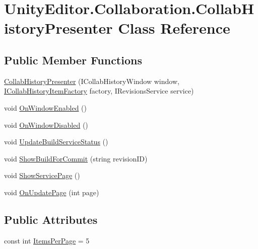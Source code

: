 \hypertarget{class_unity_editor_1_1_collaboration_1_1_collab_history_presenter}{}\section{Unity\+Editor.\+Collaboration.\+Collab\+History\+Presenter Class Reference}
\label{class_unity_editor_1_1_collaboration_1_1_collab_history_presenter}
\subsection*{Public Member Functions}
\begin{DoxyCompactItemize}
\item 
\mbox{\hyperlink{class_unity_editor_1_1_collaboration_1_1_collab_history_presenter_a98a53853b14ff55206d6d1a0c97529f1}{Collab\+History\+Presenter}} (I\+Collab\+History\+Window window, \mbox{\hyperlink{interface_unity_editor_1_1_collaboration_1_1_i_collab_history_item_factory}{I\+Collab\+History\+Item\+Factory}} factory, I\+Revisions\+Service service)
\item 
void \mbox{\hyperlink{class_unity_editor_1_1_collaboration_1_1_collab_history_presenter_acba3dc89a6ab81f606e1aab7f5f67630}{On\+Window\+Enabled}} ()
\item 
void \mbox{\hyperlink{class_unity_editor_1_1_collaboration_1_1_collab_history_presenter_a1d9943c824329af4ff6008dc891b6cba}{On\+Window\+Disabled}} ()
\item 
void \mbox{\hyperlink{class_unity_editor_1_1_collaboration_1_1_collab_history_presenter_affaaa9e1fa64b6028db288c380c0023d}{Update\+Build\+Service\+Status}} ()
\item 
void \mbox{\hyperlink{class_unity_editor_1_1_collaboration_1_1_collab_history_presenter_af05c6fa5503d623f18938306e1c764f1}{Show\+Build\+For\+Commit}} (string revision\+ID)
\item 
void \mbox{\hyperlink{class_unity_editor_1_1_collaboration_1_1_collab_history_presenter_ac2d859f1145229b9e3f79a6f3bcdadab}{Show\+Service\+Page}} ()
\item 
void \mbox{\hyperlink{class_unity_editor_1_1_collaboration_1_1_collab_history_presenter_adeccc84634516b7006ba0f9eeeaf42c5}{On\+Update\+Page}} (int page)
\end{DoxyCompactItemize}
\subsection*{Public Attributes}
\begin{DoxyCompactItemize}
\item 
const int \mbox{\hyperlink{class_unity_editor_1_1_collaboration_1_1_collab_history_presenter_a8c5a56abaa6379581e5d7894ea2cb65d}{Items\+Per\+Page}} = 5
\end{DoxyCompactItemize}
